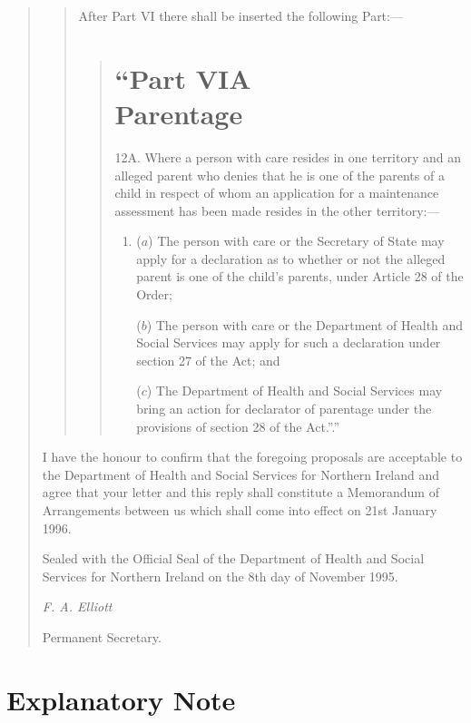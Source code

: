 \documentclass[12pt,a4paper]{article}
\begin{document}
\begin{quotation}
\begin{quotation}
  After Part VI there shall be inserted the following Part:—
\begin{quotation}
 \part*{“Part VIA\\Parentage}

12A.  Where a person with care resides in one territory and an alleged parent who denies that he is one of the parents of a child in respect of whom an application for a maintenance assessment has been made resides in the other territory:—
\begin{enumerate}\item[]
\begin{sloppypar}
($a$) The person with care or the Secretary of State may apply for a declaration as to whether or not the alleged parent is one of the child’s parents, under Article 28 of the Order;
\end{sloppypar}

($b$) The person with care or the Department of Health and Social Services may apply for such a declaration under section 27 of the Act; and

($c$) The Department of Health and Social Services may bring an action for declarator of parentage under the provisions of section 28 of the Act.”.”
\end{enumerate}
\end{quotation}
\end{quotation}

  I have the honour to confirm that the foregoing proposals are acceptable to the Department of Health and Social Services for Northern Ireland and agree that your letter and this reply shall constitute a Memorandum of Arrangements between us which shall come into effect on 21st January 1996.

  Sealed with the Official Seal of the Department of Health and Social Services for Northern Ireland on the 8th day of November 1995.

  \emph{F. A. Elliott}

  Permanent Secretary.
\end{quotation}

\part{Explanatory Note}

\renewcommand\parthead{--- Explanatory Note}
\end{document}
